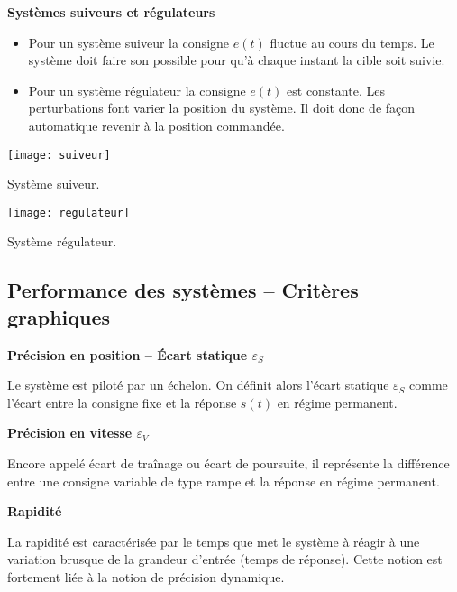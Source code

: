 \begin{defi}\textbf{Systèmes suiveurs et régulateurs} 
\begin{itemize}
\item Pour un système suiveur la consigne $e(t)$ fluctue au cours du temps. Le système doit faire son possible pour qu'à chaque instant la cible soit suivie.
\item Pour un système régulateur la consigne $e(t)$ est constante. Les perturbations font varier la position du système. Il doit donc de façon automatique revenir à la position commandée.
\end{itemize}
\end{defi}


\begin{marginfigure}
\texttt{[image: suiveur]}
\caption{Système suiveur.}
\end{marginfigure}


\begin{marginfigure}
\texttt{[image: regulateur]}
\caption{Système régulateur.}
\end{marginfigure}

\subsection{Performance des systèmes -- Critères graphiques}
\begin{defi}\textbf{Précision en position -- Écart statique $\varepsilon_S$}

Le système est piloté par un échelon. On définit alors l'écart statique $\varepsilon_S$ comme l'écart entre la consigne fixe et la réponse $s(t)$ en régime permanent.
\end{defi}

\begin{defi}\textbf{Précision en vitesse $\varepsilon_V$}

Encore appelé écart de traînage ou écart de poursuite, il représente la différence entre une consigne variable de type rampe et la réponse en régime permanent. 
\end{defi}

\begin{defi}\textbf{Rapidité}

La rapidité est caractérisée par le temps que met le système à réagir à une
variation brusque de la grandeur d'entrée (temps de réponse). Cette notion est
fortement liée à la notion de précision dynamique.
\end{defi}

